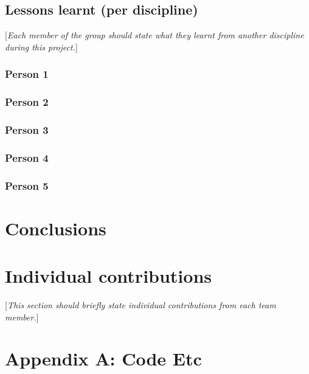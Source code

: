 \documentclass[10pt,english, openany]{book}
\begin{document}
\section{Lessons learnt (per discipline)}
[\textit{Each member of the group should state what they learnt from another discipline during this project.}]
\subsection{Person 1}
\subsection{Person 2}
\subsection{Person 3}
\subsection{Person 4}
\subsection{Person 5}

\chapter{Conclusions}

\chapter{Individual contributions}
[\textit{This section should briefly state individual contributions from each team member.}]

\pagebreak





\pagebreak

\chapter*{Appendix A: Code Etc}
\end{document}
